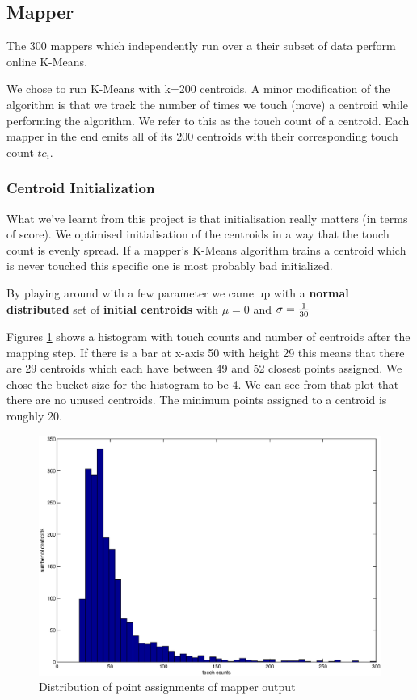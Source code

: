 \documentclass[a4paper, 11pt]{article}
\begin{document}
\subsection{Mapper}
The 300 mappers which independently run over a their subset of data perform online K-Means.

We chose to run K-Means with k=200 centroids. A minor modification of the algorithm is that we track the number of times we touch (move) a centroid while performing the algorithm. We refer to this as the touch count of a centroid. Each mapper in the end emits all of its 200 centroids with their corresponding touch count $tc_i$.


\subsubsection{Centroid Initialization}
What we've learnt from this project is that initialisation really matters (in terms of score). We optimised initialisation of the centroids in a way that the touch count is evenly spread. If a mapper's K-Means algorithm trains a centroid which is never touched this specific one is most probably bad initialized.

By playing around with a few parameter we came up with a \textbf{normal distributed} set of \textbf{initial centroids} with $\mu = 0$ and $\sigma = {1 \over 30}$


Figures \ref{fig:proj3-initialisation} shows a histogram with touch counts and number of centroids after the mapping step. If there is a bar at x-axis 50 with height 29 this means that there are 29 centroids which each have between 49 and 52 closest points assigned. We chose the bucket size for the histogram to be 4. We can see from that plot that there are no unused centroids. The minimum points assigned to a centroid is roughly 20.

\begin{figure}[H]
\centering
\includegraphics[scale=0.35]{histogram.eps}
\caption{Distribution of point assignments of mapper output}
\label{fig:proj3-initialisation}
\end{figure}
\end{document}
